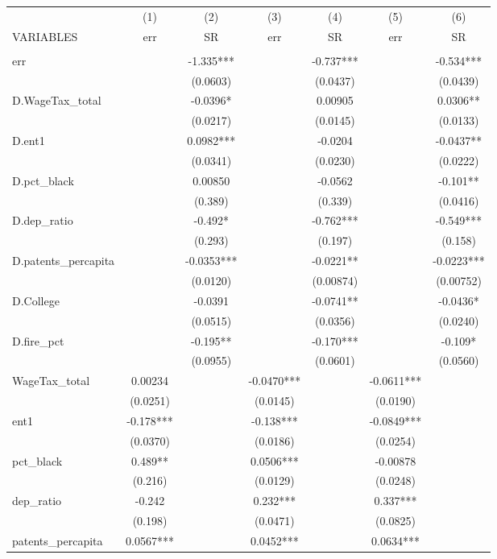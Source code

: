 \begin{tabular}{lcccccc} \hline
 & (1) & (2) & (3) & (4) & (5) & (6) \\
VARIABLES & err & SR & err & SR & err & SR \\ \hline
 &  &  &  &  &  &  \\
err &  & -1.335*** &  & -0.737*** &  & -0.534*** \\
 &  & (0.0603) &  & (0.0437) &  & (0.0439) \\
D.WageTax\_total &  & -0.0396* &  & 0.00905 &  & 0.0306** \\
 &  & (0.0217) &  & (0.0145) &  & (0.0133) \\
D.ent1 &  & 0.0982*** &  & -0.0204 &  & -0.0437** \\
 &  & (0.0341) &  & (0.0230) &  & (0.0222) \\
D.pct\_black &  & 0.00850 &  & -0.0562 &  & -0.101** \\
 &  & (0.389) &  & (0.339) &  & (0.0416) \\
D.dep\_ratio &  & -0.492* &  & -0.762*** &  & -0.549*** \\
 &  & (0.293) &  & (0.197) &  & (0.158) \\
D.patents\_percapita &  & -0.0353*** &  & -0.0221** &  & -0.0223*** \\
 &  & (0.0120) &  & (0.00874) &  & (0.00752) \\
D.College &  & -0.0391 &  & -0.0741** &  & -0.0436* \\
 &  & (0.0515) &  & (0.0356) &  & (0.0240) \\
D.fire\_pct &  & -0.195** &  & -0.170*** &  & -0.109* \\
 &  & (0.0955) &  & (0.0601) &  & (0.0560) \\
WageTax\_total & 0.00234 &  & -0.0470*** &  & -0.0611*** &  \\
 & (0.0251) &  & (0.0145) &  & (0.0190) &  \\
ent1 & -0.178*** &  & -0.138*** &  & -0.0849*** &  \\
 & (0.0370) &  & (0.0186) &  & (0.0254) &  \\
pct\_black & 0.489** &  & 0.0506*** &  & -0.00878 &  \\
 & (0.216) &  & (0.0129) &  & (0.0248) &  \\
dep\_ratio & -0.242 &  & 0.232*** &  & 0.337*** &  \\
 & (0.198) &  & (0.0471) &  & (0.0825) &  \\
patents\_percapita & 0.0567*** &  & 0.0452*** &  & 0.0634*** &  \\

\end{tabular}
